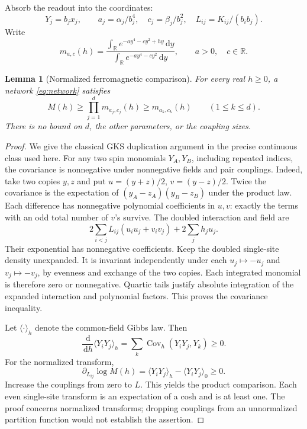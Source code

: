 \documentclass[11pt]{article}
\newtheorem{lemma}[theorem]{Lemma}
\theoremstyle{remark}
\newcommand{\R}{\mathbb R}
\newcommand{\dd}{\,\mathrm d}
\newcommand{\Cov}{\operatorname{Cov}}
\numberwithin{equation}{section}
\begin{document}
Absorb the readout into the coordinates:
\begin{equation}\label{eq:effective}
 Y_j=b_jx_j,\qquad
 a_j=\alpha_j/b_j^4,\quad c_j=\beta_j/b_j^2,\quad
 L_{ij}=K_{ij}/(b_ib_j).
\end{equation}
Write
\begin{equation}\label{eq:site}
 m_{a,c}(h)=
 \frac{\int_\R e^{-ay^4-cy^2+hy}\dd y}
      {\int_\R e^{-ay^4-cy^2}\dd y},
 \qquad a>0,\quad c\in\R.
\end{equation}

\begin{lemma}[Normalized ferromagnetic comparison]\label{lem:gks}
For every real \(h\ge0\), a network \eqref{eq:network} satisfies
\begin{equation}\label{eq:comparison}
 M(h)\ge\prod_{j=1}^d m_{a_j,c_j}(h)\ge m_{a_k,c_k}(h)
 \qquad(1\le k\le d).
\end{equation}
There is no bound on \(d\), the other parameters, or the coupling sizes.
\end{lemma}
\begin{proof}
We give the classical GKS duplication argument in the precise continuous
class used here. For any two spin monomials \(Y_A,Y_B\), including repeated
indices, the covariance is nonnegative under nonnegative fields and pair
couplings. Indeed, take two copies \(y,z\) and put
\(u=(y+z)/2\), \(v=(y-z)/2\).
Twice the covariance is the expectation of
\((y_A-z_A)(y_B-z_B)\) under the product law.
Each difference has nonnegative polynomial coefficients in \(u,v\):
exactly the terms with an odd total number of \(v\)'s survive.
The doubled interaction and field are
\[
 2\sum_{i<j}L_{ij}(u_iu_j+v_iv_j)+2\sum_jh_ju_j.
\]
Their exponential has nonnegative coefficients. Keep the doubled
single-site density unexpanded. It is invariant independently under
each \(u_j\mapsto-u_j\) and \(v_j\mapsto-v_j\), by evenness and exchange
of the two copies. Each integrated monomial is therefore zero or
nonnegative. Quartic tails justify absolute integration of the expanded
interaction and polynomial factors. This proves the covariance inequality.

Let \(\langle\cdot\rangle_h\) denote the common-field Gibbs law. Then
\[
 \frac{\dd}{\dd h}\langle Y_iY_j\rangle_h
  =\sum_k\Cov_h(Y_iY_j,Y_k)\ge0.
\]
For the normalized transform,
\[
 \partial_{L_{ij}}\log M(h)
  =\langle Y_iY_j\rangle_h-\langle Y_iY_j\rangle_0\ge0.
\]
Increase the couplings from zero to \(L\). This yields the product
comparison. Each even single-site transform is an expectation of a
cosh and is at least one. The proof concerns normalized transforms;
dropping couplings from an unnormalized partition function would not
establish the assertion.
\end{proof}
\end{document}
